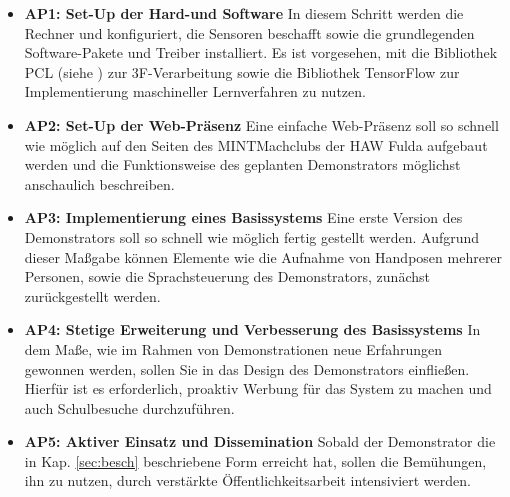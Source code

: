 \documentclass[11pt]{article}
\begin{document}
\begin{itemize}
\item \textbf {AP1: Set-Up der Hard-und Software} In diesem Schritt werden die Rechner und konfiguriert, die Sensoren beschafft sowie die grundlegenden Software-Pakete und Treiber installiert. Es ist vorgesehen, mit die Bibliothek PCL (siehe \cite{pcl}) zur 3F-Verarbeitung sowie die Bibliothek TensorFlow\cite{tf} zur Implementierung maschineller Lernverfahren zu nutzen.
\item \textbf {AP2: Set-Up der Web-Präsenz} Eine einfache Web-Präsenz soll so schnell wie möglich auf den Seiten des MINTMachclubs der HAW Fulda aufgebaut werden und die Funktionsweise des geplanten Demonstrators möglichst anschaulich beschreiben.
\item \textbf {AP3: Implementierung eines Basissystems} Eine erste Version des Demonstrators soll so schnell wie möglich fertig gestellt werden. Aufgrund dieser Maßgabe können Elemente wie die Aufnahme von Handposen mehrerer Personen, sowie die Sprachsteuerung des Demonstrators, zunächst zurückgestellt werden.
\item\textbf{AP4: Stetige Erweiterung und Verbesserung des Basissystems}
In dem Maße, wie im Rahmen von Demonstrationen neue Erfahrungen gewonnen werden, sollen Sie in das Design des Demonstrators einfließen. Hierfür ist es erforderlich, proaktiv Werbung für das System zu machen und auch Schulbesuche durchzuführen.
\item\textbf{AP5: Aktiver Einsatz und Dissemination}
Sobald der Demonstrator die in Kap. \ref{sec:besch} beschriebene Form erreicht hat, sollen die Bemühungen, ihn zu nutzen, durch verstärkte Öffentlichkeitsarbeit intensiviert werden.
\end{itemize}
%
\newpage


%
\end{document}
